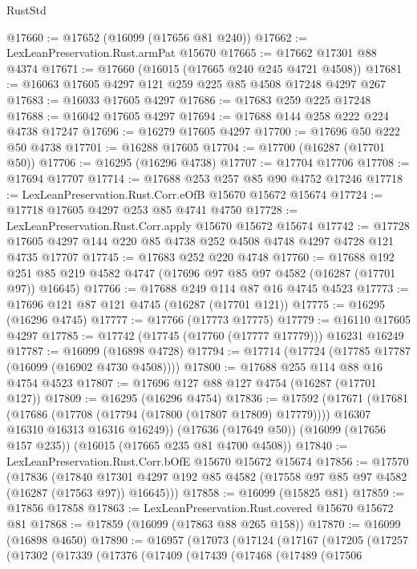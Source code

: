 \begin{lexlean}{RustStd}
\begin{coremodule}
@17660 := @17652 (@16099 (@17656 @81 @240))
@17662 := LexLeanPreservation.Rust.armPat @15670
@17665 := @17662 @17301 @88 @4374
@17671 := @17660 (@16015 (@17665 @240 @245 @4721 @4508))
@17681 := @16063 @17605 @4297 @121 @259 @225 @85 @4508 @17248 @4297 @267
@17683 := @16033 @17605 @4297
@17686 := @17683 @259 @225 @17248
@17688 := @16042 @17605 @4297
@17694 := @17688 @144 @258 @222 @224 @4738 @17247
@17696 := @16279 @17605 @4297
@17700 := @17696 @50 @222 @50 @4738
@17701 := @16288 @17605
@17704 := @17700 (@16287 (@17701 @50))
@17706 := @16295 (@16296 @4738)
@17707 := @17704 @17706
@17708 := @17694 @17707
@17714 := @17688 @253 @257 @85 @90 @4752 @17246
@17718 := LexLeanPreservation.Rust.Corr.eOfB @15670 @15672 @15674
@17724 := @17718 @17605 @4297 @253 @85 @4741 @4750
@17728 := LexLeanPreservation.Rust.Corr.apply @15670 @15672 @15674
@17742 := @17728 @17605 @4297 @144 @220 @85 @4738 @252 @4508 @4748 @4297 @4728 @121 @4735 @17707
@17745 := @17683 @252 @220 @4748
@17760 := @17688
    @192
    @251
    @85
    @219
    @4582
    @4747
    (@17696 @97 @85 @97 @4582 (@16287 (@17701 @97)) @16645)
@17766 := @17688 @249 @114 @87 @16 @4745 @4523
@17773 := @17696 @121 @87 @121 @4745 (@16287 (@17701 @121))
@17775 := @16295 (@16296 @4745)
@17777 := @17766 (@17773 @17775)
@17779 := @16110 @17605 @4297
@17785 := @17742 (@17745 (@17760 (@17777 @17779))) @16231 @16249
@17787 := @16099 (@16898 @4728)
@17794 := @17714 (@17724 (@17785 @17787 (@16099 (@16902 @4730 @4508))))
@17800 := @17688 @255 @114 @88 @16 @4754 @4523
@17807 := @17696 @127 @88 @127 @4754 (@16287 (@17701 @127))
@17809 := @16295 (@16296 @4754)
@17836 := @17592
    (@17671
      (@17681
        (@17686 (@17708 (@17794 (@17800 (@17807 @17809) @17779))))
        @16307
        @16310
        @16313
        @16316
        @16249))
    (@17636 (@17649 @50))
    (@16099 (@17656 @157 @235))
    (@16015 (@17665 @235 @81 @4700 @4508))
@17840 := LexLeanPreservation.Rust.Corr.bOfE @15670 @15672 @15674
@17856 := @17570
    (@17836
      (@17840 @17301 @4297 @192 @85 @4582 (@17558 @97 @85 @97 @4582 (@16287 (@17563 @97)) @16645)))
@17858 := @16099 (@15825 @81)
@17859 := @17856 @17858
@17863 := LexLeanPreservation.Rust.covered @15670 @15672 @81
@17868 := @17859 (@16099 (@17863 @88 @265 @158))
@17870 := @16099 (@16898 @4650)
@17890 := @16957
    (@17073
      (@17124
        (@17167
          (@17205
            (@17257
              (@17302
                (@17339
                  (@17376
                    (@17409
                      (@17439
                        (@17468
                          (@17489
                            (@17506

\end{coremodule}
\end{lexlean}
